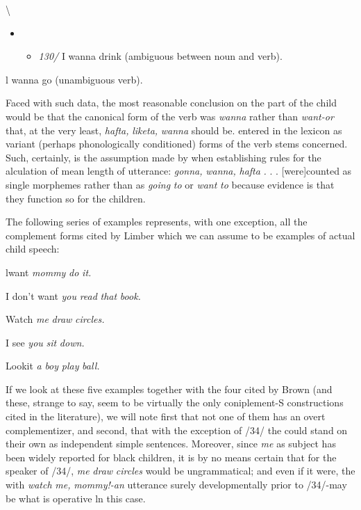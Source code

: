 {\textbackslash}


\begin{itemize}
\item \begin{itemize}
\item \textit{130/} I wanna drink (ambiguous between noun and verb).
\end{itemize}
\end{itemize}

\ea\label{ex:31}
 l wanna go (unambiguous verb).
\glt
\z

Faced with such data, the most reasonable conclusion on the part of the child would be that the canonical form of the verb was \textit{wanna} rather than \textit{want-or} that, at the very least, \textit{hafta,} \textit{liketa,} \textit{wanna} should be. entered in the lexicon as variant (perhaps phonologically condi\-tioned) forms of the verb stems concerned. Such, certainly, is the assumption made by \citet[54]{Brown1973} when establishing rules for the alculation of mean length of utterance: \textit{{\textquotedbl}gonna,} \textit{wanna,} \textit{hafta} \textit{.} . . [were]counted as single morphemes rather than as \textit{going} \textit{to} or \textit{want} \textit{to} because evidence is that they function so for the children.{\textquotedbl}

The following series of examples represents, with one exception, all the  complement forms cited by Limber which we can assume to be examples of actual child speech:

\ea\label{ex:32}
 lwant \textit{mommy} \textit{do} \textit{it.}
\glt
\z

\ea\label{ex:33}
 I don't want \textit{you} \textit{read} \textit{that} \textit{book.}
\glt
\z


\ea\label{ex:34}
 Watch \textit{me} \textit{draw} \textit{circles.}
\glt
\z

\ea\label{ex:35}
 I see \textit{you} \textit{sit} \textit{down.}
\glt
\z

\ea\label{ex:36}
 Lookit \textit{a} \textit{boy} \textit{play} \textit{ball.}
\glt
\z

If we look at these five examples together with the four cited by Brown (and these, strange to say, seem to be virtually the only coniplement-S constructions cited in the literature), we will note first that not one of them has an overt complementizer, and second,
that with the exception of /34/ the  could stand on their own as independent simple sentences. Moreover, since \textit{me} as subject
has been widely reported for black children, it is by no means certain that for the speaker of /34/, \textit{me} \textit{draw} \textit{circles} would be ungrammatical; and even if it were, the  with \textit{watch} \textit{me,} \textit{mommy!-an} utterance surely developmentally prior to /34/-may be what is operative ln this case.


